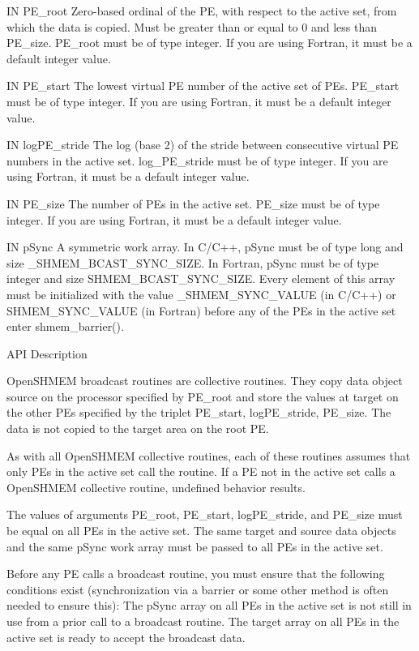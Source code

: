 	IN       PE_root	   Zero-based ordinal of the PE, with respect  to  the	active
		   set,	 from  which the data is copied.  Must be greater than
		   or equal to 0 and less than PE_size.	 PE_root  must	be  of
		   type	 integer.   If	you  are  using	 Fortran, it must be a
		   default integer value.

       IN	PE_start	   The lowest virtual PE number of  the	 active	 set  of  PEs.
		   PE_start  must  be  of  type	 integer.   If	you  are using
		   Fortran, it must be a default integer value.

       IN	logPE_stride
		   The log (base 2) of the stride between consecutive  virtual
		   PE  numbers	in  the	 active set.  log_PE_stride must be of
		   type integer.  If you are  using  Fortran,  it  must	 be  a
		   default integer value.

       IN	PE_size	   The	number	of  PEs in the active set.  PE_size must be of
		   type integer.  If you are  using  Fortran,  it  must	 be  a
		   default integer value.

       IN	pSync	   A  symmetric	 work  array.  In C/C++, pSync must be of type
		   long and size _SHMEM_BCAST_SYNC_SIZE.   In  Fortran,	 pSync
		   must	 be  of	 type  integer and size SHMEM_BCAST_SYNC_SIZE.
		   Every element of this array must be	initialized  with  the
		   value  _SHMEM_SYNC_VALUE (in C/C++) or SHMEM_SYNC_VALUE (in
		   Fortran) before any of the PEs  in  the  active  set	 enter
		   shmem_barrier().

API Description

       OpenSHMEM broadcast routines are collective routines.
       They copy data object source on the processor specified by PE_root  and
       store  the  values  at target on the other PEs specified by the triplet
       PE_start, logPE_stride, PE_size.	 The data is not copied to the	target
       area on the root PE.

       As  with	 all OpenSHMEM collective routines, each of these routines assumes
       that only PEs in the active set call the routine.  If a PE not  in  the
       active  set  calls  a  OpenSHMEM  collective	 routine,  undefined  behavior
       results.

       The  values  of	arguments PE_root, PE_start, logPE_stride, and PE_size
       must be equal on all PEs in the active set.  The same target and source
       data objects and the same pSync work array must be passed to all PEs in
       the active set.

       Before any PE calls a broadcast	routine,  you  must  ensure  that  the
       following conditions exist (synchronization via a barrier or some other
       method is often needed to ensure this): The pSync array on all  PEs  in
       the  active  set	 is  not still in use from a prior call to a broadcast
       routine.	 The target array on all PEs in the active  set	 is  ready  to
       accept the broadcast data.

